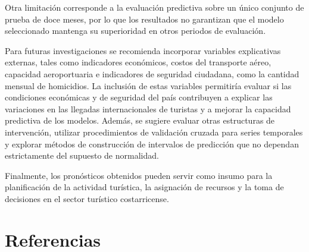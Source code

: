 \documentclass[12pt]{article}
\begin{document}
Otra limitación corresponde a la evaluación predictiva 
sobre un único conjunto de prueba de doce meses, 
por lo que los resultados no garantizan que el modelo 
seleccionado mantenga su superioridad en otros 
periodos de evaluación.

Para futuras investigaciones se recomienda incorporar 
variables explicativas externas, tales como indicadores 
económicos, costos del transporte aéreo, capacidad 
aeroportuaria e indicadores de seguridad ciudadana, 
como la cantidad mensual de homicidios. La inclusión 
de estas variables permitiría evaluar si las condiciones 
económicas y de seguridad del país contribuyen a explicar 
las variaciones en las llegadas internacionales de 
turistas y a mejorar la capacidad predictiva de los 
modelos. Además, se sugiere evaluar otras 
estructuras de intervención, utilizar procedimientos 
de validación cruzada para series temporales y 
explorar métodos de construcción de intervalos de 
predicción que no dependan estrictamente del supuesto 
de normalidad.

Finalmente, los pronósticos obtenidos pueden servir 
como insumo para la planificación de la actividad 
turística, la asignación de recursos y la toma de 
decisiones en el sector turístico costarricense.































\section*{Referencias}
\end{document}
